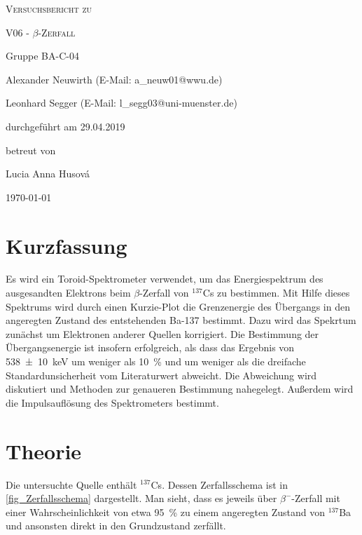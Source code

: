 \documentclass[
	a4paper,
	12pt,
	pagesize,
	ngerman
]{scrartcl}
\begin{document}
	\begin{titlepage}
		\centering
		{\scshape\LARGE Versuchsbericht zu \par}
		\vspace{1cm}
		{\scshape\huge V06 - $\beta$-Zerfall \par}
		\vspace{2.5cm}
		{\LARGE Gruppe BA-C-04 \par}
		\vspace{0.5cm}

		{\large Alexander Neuwirth (E-Mail: a\_neuw01@wwu.de) \par}
		{\large Leonhard Segger (E-Mail: l\_segg03@uni-muenster.de) \par}
		\vfill

		durchgeführt am 29.04.2019\par
		betreut von\par
		{\large Lucia Anna Husová}

		\vfill

		{\large \today\par}
	\end{titlepage}
	\tableofcontents
	\newpage


	\section{Kurzfassung}
	Es wird ein Toroid-Spektrometer verwendet, um das Energiespektrum des ausgesandten Elektrons beim $\beta$-Zerfall von $^{137}$Cs zu bestimmen.
	Mit Hilfe dieses Spektrums wird durch einen Kurzie-Plot die Grenzenergie des Übergangs in den angeregten Zustand des entstehenden Ba-137 bestimmt.
	Dazu wird das Spekrtum zunächst um Elektronen anderer Quellen korrigiert.
	Die Bestimmung der Übergangsenergie ist insofern erfolgreich, als dass das Ergebnis von \SI{538 \pm 10}{keV} um weniger als \SI{10}{\percent} und um weniger als die dreifache Standardunsicherheit vom Literaturwert abweicht.
	Die Abweichung wird diskutiert und Methoden zur genaueren Bestimmung nahegelegt.
	Außerdem wird  die Impulsauflösung des Spektrometers bestimmt.

  \section{Theorie}
	Die untersuchte Quelle enthält $^{137}$Cs.
	Dessen Zerfallsschema ist in \cref{fig_Zerfallsschema} dargestellt.
	Man sieht, dass es jeweils über $\beta^-$-Zerfall mit einer Wahrscheinlichkeit von etwa \SI{95}{\percent} zu einem angeregten Zustand von $^{137}$Ba und ansonsten direkt in den Grundzustand zerfällt.
\end{document}
